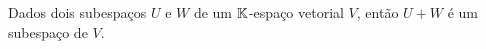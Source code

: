 \begin{teorema}
	Dados dois subespaços $U$ e $W$ de um $\mathbb{K}$-espaço vetorial $V$, então $U + W$ é um subespaço de $V$.
\end{teorema}


%
%

